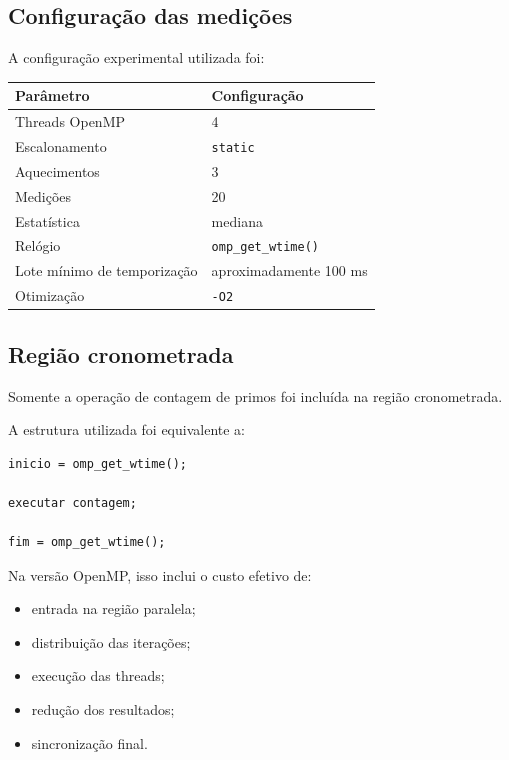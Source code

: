\subsection{Configuração das medições}

A configuração experimental utilizada foi:

\begin{center}
\begin{tabular}{|l|l|}
\hline
\textbf{Parâmetro} & \textbf{Configuração} \\
\hline
Threads OpenMP & 4 \\
\hline
Escalonamento & \texttt{static} \\
\hline
Aquecimentos & 3 \\
\hline
Medições & 20 \\
\hline
Estatística & mediana \\
\hline
Relógio & \texttt{omp\_get\_wtime()} \\
\hline
Lote mínimo de temporização & aproximadamente 100 ms \\
\hline
Otimização & \texttt{-O2} \\
\hline
\end{tabular}
\end{center}


\subsection{Região cronometrada}

Somente a operação de contagem de primos foi incluída na região
cronometrada.

A estrutura utilizada foi equivalente a:

\begin{verbatim}
inicio = omp_get_wtime();

executar contagem;

fim = omp_get_wtime();
\end{verbatim}

Na versão OpenMP, isso inclui o custo efetivo de:

\begin{itemize}
    \item entrada na região paralela;
    \item distribuição das iterações;
    \item execução das threads;
    \item redução dos resultados;
    \item sincronização final.
\end{itemize}

